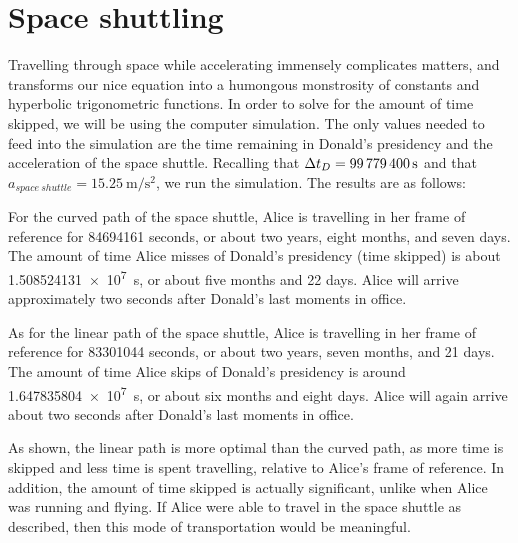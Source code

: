 \section{Space shuttling}
	Travelling through space while accelerating immensely complicates matters, and transforms our nice equation into a humongous monstrosity of constants and hyperbolic trigonometric functions. In order to solve for the amount of time skipped, we will be using the computer simulation. The only values needed to feed into the simulation are the time remaining in Donald's presidency and the acceleration of the space shuttle. Recalling that $\mathrm{\Delta} t_D = \SI{99779400}{\second}$ and that $a_{space\ shuttle} = \SI{15.25}{\metre/\second^2}$, we run the simulation. The results are as follows:

	For the curved path of the space shuttle, Alice is travelling in her frame of reference for \num{84694161} seconds, or about two years, eight months, and seven days. The amount of time Alice misses of Donald's presidency (time skipped) is about \SI{1.508524131e7}{\second}, or about five months and 22 days. Alice will arrive approximately two seconds after Donald's last moments in office.

As for the linear path of the space shuttle, Alice is travelling in her frame of reference for \num{83301044} seconds, or about two years, seven months, and 21 days. The amount of time Alice skips of Donald's presidency is around \SI{1.647835804e7}{\second}, or about six months and eight days. Alice will again arrive about two seconds after Donald's last moments in office.

As shown, the linear path is more optimal than the curved path, as more time is skipped and less time is spent travelling, relative to Alice's frame of reference. In addition, the amount of time skipped is actually significant, unlike when Alice was running and flying. If Alice were able to travel in the space shuttle as described, then this mode of transportation would be meaningful.
